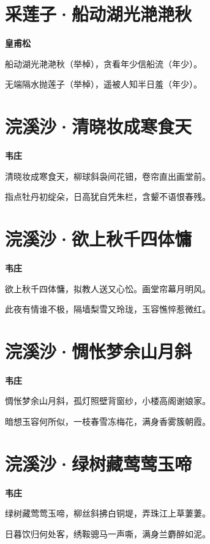 \documentclass[12pt,a4paper]{ctexbook}
\begin{document}
\section{采莲子·船动湖光滟滟秋}
\textbf{皇甫松}\par\vspace{0.5em}
船动湖光滟滟秋（举棹），贪看年少信船流（年少）。\par
无端隔水抛莲子（举棹），遥被人知半日羞（年少）。\par

\section{浣溪沙·清晓妆成寒食天}
\textbf{韦庄}\par\vspace{0.5em}
清晓妆成寒食天，柳球斜袅间花钿，卷帘直出画堂前。\par
指点牡丹初绽朵，日高犹自凭朱栏，含颦不语恨春残。\par

\section{浣溪沙·欲上秋千四体慵}
\textbf{韦庄}\par\vspace{0.5em}
欲上秋千四体慵，拟教人送又心忪。画堂帘幕月明风。\par
此夜有情谁不极，隔墙梨雪又玲珑，玉容憔悴惹微红。\par

\section{浣溪沙·惆怅梦余山月斜}
\textbf{韦庄}\par\vspace{0.5em}
惆怅梦余山月斜，孤灯照壁背窗纱，小楼高阁谢娘家。\par
暗想玉容何所似，一枝春雪冻梅花，满身香雾簇朝霞。\par

\section{浣溪沙·绿树藏莺莺玉啼}
\textbf{韦庄}\par\vspace{0.5em}
绿树藏莺莺玉啼，柳丝斜拂白铜堤，弄珠江上草萋萋。\par
日暮饮归何处客，绣鞍骢马一声嘶，满身兰麝醉如泥。\par
\end{document}
